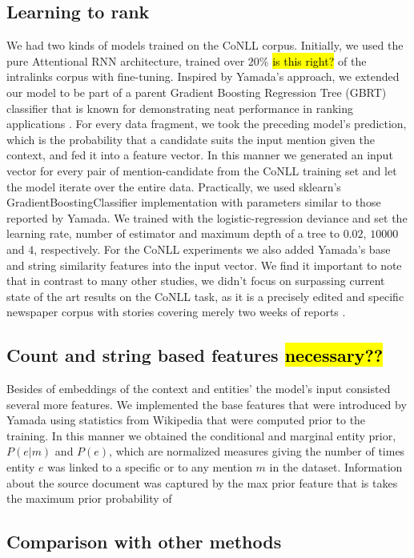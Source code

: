 \documentclass[11pt]{article}
\begin{document}
	\subsection{Learning to rank}
	We had two kinds of models trained on the CoNLL corpus. Initially, we used the pure Attentional RNN architecture, trained over $20$\% \hl{is this right?} of the intralinks corpus with fine-tuning. 
	Inspired by Yamada's approach, we extended our model to be part of a parent Gradient Boosting Regression Tree (GBRT) classifier that is known for demonstrating neat performance in ranking applications \cite{friedman2001greedy}. For every data fragment, we took the preceding model's prediction, which is the probability that a candidate suits the input mention given the context, and fed it into a feature vector. In this manner we generated an input vector for every pair of mention-candidate from the CoNLL training set and let the model iterate over the entire data. Practically, we used sklearn's GradientBoostingClassifier implementation \cite{pedregosa2011scikit} with parameters similar to those reported by Yamada. We trained with the logistic-regression deviance and set the learning rate, number of estimator and maximum depth of a tree to $0.02$, $10000$ and $4$, respectively. For the CoNLL experiments we also added Yamada's base and string similarity features into the input vector. 
	We find it important to note that in contrast to many other studies, we didn't focus on surpassing current state of the art results on the CoNLL task, as it is a precisely edited and specific newspaper corpus with stories covering merely two weeks of reports \cite{Sang2003}. 

	\subsection{Count and string based features \hl{necessary??}}
	Besides of embeddings of the context and entities' the model's input consisted several more features. We implemented the base features that were introduced by Yamada using statistics from Wikipedia that were computed prior to the training. In this manner we obtained the conditional and marginal entity prior, $P(e|m)$ and $P(e)$, which are normalized measures giving the number of times entity $e$ was linked to a specific or to any mention $m$ in the dataset. Information about the source document was captured by the max prior feature that is takes the maximum prior probability of 
	
	\subsection{Comparison with other methods}
	
\end{document}
